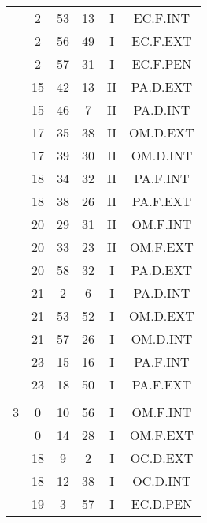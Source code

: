 \documentclass[12pt, a4paper]{article}
\begin{document}
\begin{multicols}{3}
{\begin{tabular}{c c c c c c}
	 	 	 	 & 2 & 53 & 13 & I & EC.F.INT\\%
	 	 	 	 & 2 & 56 & 49 & I & EC.F.EXT\\%
	 	 	 	 & 2 & 57 & 31 & I & EC.F.PEN\\%
	 	 	 	 & 15 & 42 & 13 & II & PA.D.EXT\\%
	 	 	 	 & 15 & 46 & 7 & II & PA.D.INT\\%
	 	 	 	 & 17 & 35 & 38 & II & OM.D.EXT\\%
	 	 	 	 & 17 & 39 & 30 & II & OM.D.INT\\%
	 	 	 	 & 18 & 34 & 32 & II & PA.F.INT\\%
	 	 	 	 & 18 & 38 & 26 & II & PA.F.EXT\\%
	 	 	 	 & 20 & 29 & 31 & II & OM.F.INT\\%
	 	 	 	 & 20 & 33 & 23 & II & OM.F.EXT\\%
	 	 	 	 & 20 & 58 & 32 & I & PA.D.EXT\\%
	 	 	 	 & 21 & 2 & 6 & I & PA.D.INT\\%
	 	 	 	 & 21 & 53 & 52 & I & OM.D.EXT\\%
	 	 	 	 & 21 & 57 & 26 & I & OM.D.INT\\%
	 	 	 	 & 23 & 15 & 16 & I & PA.F.INT\\%
	 	 	 	 & 23 & 18 & 50 & I & PA.F.EXT\\%
	 	 	 	 & & & & & \\%
	 	 	 	3 & 0 & 10 & 56 & I & OM.F.INT\\%
	 	 	 	 & 0 & 14 & 28 & I & OM.F.EXT\\%
	 	 	 	 & 18 & 9 & 2 & I & OC.D.EXT\\%
	 	 	 	 & 18 & 12 & 38 & I & OC.D.INT\\%
	 	 	 	 & 19 & 3 & 57 & I & EC.D.PEN\\%

\end{tabular}}
\end{multicols}
\end{document}
